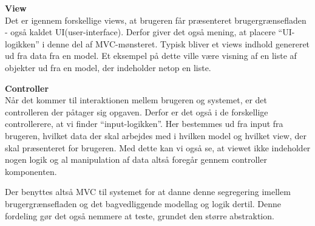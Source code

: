 \textbf{View}\\
Det er igennem forskellige views, at brugeren får præsenteret brugergrænsefladen - også kaldet UI(user-interface). 
Derfor giver det også mening, at placere ``UI-logikken'' i denne del af MVC-mønsteret.
Typisk bliver et views indhold genereret ud fra data fra en model.
Et eksempel på dette ville være visning af en liste af objekter ud fra en model, der indeholder netop en liste.

\textbf{Controller}\\
Når det kommer til interaktionen mellem brugeren og systemet, er det controlleren der påtager sig opgaven.
Derfor er det også i de forskellige controllerere, at vi finder ``input-logikken''. 
Her bestemmes ud fra input fra brugeren, hvilket data der skal arbejdes med i hvilken model og hvilket view, der skal præsenteret for brugeren. 
Med dette kan vi også se, at viewet ikke indeholder nogen logik og al manipulation af data altså foregår gennem controller komponenten. 

Der benyttes altså MVC til systemet for at danne denne segregering imellem brugergrænsefladen og det bagvedliggende modellag og logik dertil.
Denne fordeling gør det også nemmere at teste, grundet den større abstraktion. 
